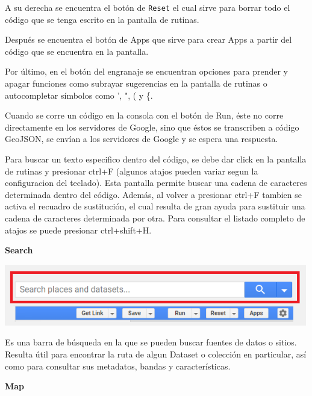 \documentclass[
]{article}
\begin{document}
A su derecha se encuentra el botón de \texttt{Reset} el cual sirve para
borrar todo el código que se tenga escrito en la pantalla de rutinas.

Después se encuentra el botón de Apps que sirve para crear Apps a partir
del código que se encuentra en la pantalla.

Por último, en el botón del engranaje se encuentran opciones para
prender y apagar funciones como subrayar sugerencias en la pantalla de
rutinas o autocompletar símbolos como ', ", ( y \{.

\begin{tipblock}
Cuando se corre un código en la consola con el botón de Run, éste no
corre directamente en los servidores de Google, sino que éstos se
transcriben a código GeoJSON, se envían a los servidores de Google y se
espera una respuesta.

\end{tipblock}

\begin{tipblock}
Para buscar un texto especifico dentro del código, se debe dar click en
la pantalla de rutinas y presionar ctrl+F (algunos atajos pueden variar
segun la configuracion del teclado). Esta pantalla permite buscar una
cadena de caracteres determinada dentro del código. Además, al volver a
presionar ctrl+F tambien se activa el recuadro de sustitución, el cual
resulta de gran ayuda para sustituir una cadena de caracteres
determinada por otra. Para consultar el listado completo de atajos se
puede presionar ctrl+shift+H.

\end{tipblock}

\textbf{Search}

\includegraphics[width=500px]{Img/search}

Es una barra de búsqueda en la que se pueden buscar fuentes de datos o
sitios. Resulta útil para encontrar la ruta de algun Dataset o colección
en particular, así como para consultar sus metadatos, bandas y
características.

\textbf{Map}
\end{document}
